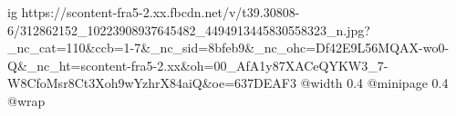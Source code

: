  
 
 
 
 

\ifcmt
  ig https://scontent-fra5-2.xx.fbcdn.net/v/t39.30808-6/312862152_10223908937645482_4494913445830558323_n.jpg?_nc_cat=110&ccb=1-7&_nc_sid=8bfeb9&_nc_ohc=Df42E9L56MQAX-wo0-Q&_nc_ht=scontent-fra5-2.xx&oh=00_AfA1y87XACeQYKW3_7-W8CfoMsr8Ct3Xoh9wYzhrX84aiQ&oe=637DEAF3
  @width 0.4
  @minipage 0.4
  @wrap \parpic[r]
\fi
